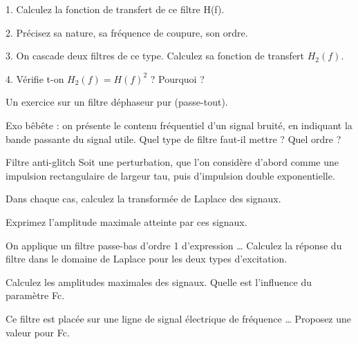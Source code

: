 	1. Calculez la fonction de transfert de ce filtre H(f).
	
	2. Précisez sa nature, sa fréquence de coupure, son ordre.
	
	3. On cascade deux filtres de ce type. Calculez sa fonction de transfert $H_{2}(f)$.
	
	4. Vérifie t-on $H_{2}(f)=H(f)^{2}$ ? Pourquoi ?
	
	\vspace{1\baselineskip}
	
	
	
	
	Un exercice sur un filtre déphaseur pur (passe-tout). 
	
	
	Exo bêbête : on présente le contenu fréquentiel d'un signal bruité, en indiquant la bande passante du signal utile. Quel type de filtre faut-il mettre ? Quel ordre ?
	
	Filtre anti-glitch
	Soit une perturbation, que l'on considère d'abord comme une impulsion rectangulaire de largeur tau, puis d'impulsion double exponentielle.
	
	Dans chaque cas, calculez la transformée de Laplace des signaux.
	
	Exprimez l'amplitude maximale atteinte par ces signaux.
	
	On applique un filtre passe-bas d'ordre 1 d'expression … Calculez la réponse du filtre dans le domaine de Laplace pour les deux types d'excitation.
	
	Calculez les amplitudes maximales des signaux. Quelle est l'influence du paramètre Fc.
	
	Ce filtre est placée sur une ligne de signal électrique de fréquence … Proposez une valeur pour Fc.
	
	\newpage
